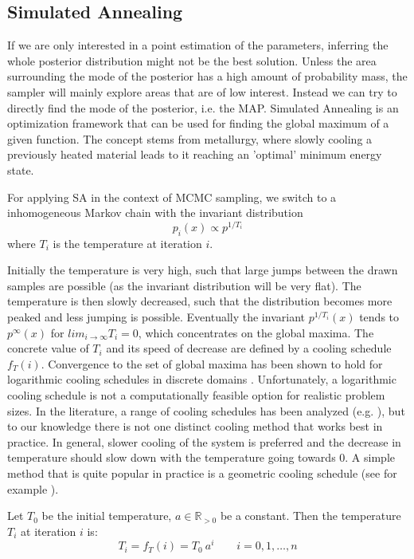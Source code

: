 \FloatBarrier


\subsection{Simulated Annealing}
\label{ss:SA}
If we are only interested in a point estimation of the parameters, 
inferring the whole posterior distribution might not be the best solution.
Unless the area surrounding the mode of the posterior has a high amount of probability mass, the sampler will mainly explore areas that are of low interest.
Instead we can try to directly find the mode of the posterior, i.e. the \gls{MAP}.
Simulated Annealing \citep{kirkpatrick1983optimization} is an optimization framework that can be used for finding the global maximum of a given function.
The concept stems from metallurgy, where slowly cooling a previously heated material leads to it reaching an 'optimal' minimum energy state.


For applying \gls{SA} in the context of \gls{MCMC} sampling, we switch to a inhomogeneous Markov chain with the invariant distribution
$$ p_i (x) \propto p^{1/T_i} $$
where $T_i$ is the temperature at iteration $i$. 

Initially the temperature is very high, such that large jumps between the drawn samples are possible (as the invariant distribution will be very flat). 
The temperature is then slowly decreased, such that the distribution becomes more peaked and less jumping is possible. 
Eventually the invariant $p^{1/T_i}(x)$ tends to $p^\infty(x)$ for $lim_{i\rightarrow \infty}T_i=0$, which concentrates on the global maxima.
The concrete value of $T_i$ and its speed of decrease are defined by a cooling schedule $f_T(i)$. 
Convergence to the set of global maxima has been shown to hold for logarithmic cooling schedules in discrete domains \citep{geman1984stochastic}.
Unfortunately, a logarithmic cooling schedule is not a computationally feasible option for realistic problem sizes.
In the literature, a range of cooling schedules has been analyzed (e.g. \citet{abramson1999simulated}), but to our knowledge there is not one distinct cooling method that works best in practice.
In general, slower cooling of the system is preferred and the decrease in temperature should slow down with the temperature going towards 0.
A simple method that is quite popular in practice is a geometric cooling schedule
(see for example \cite{andrieu2000simulated, yuan2004annealed}).

\begin{tcolorbox}[title=Geometric Cooling Schedule (1)]
	Let $T_0$ be the initial temperature, $a\in\mathbb{R}_{> 0}$ be a constant.
	Then the temperature $T_i$ at iteration $i$ is:
	$$
	T_i = f_T(i) = T_0\  a^{i} \quad \quad i = 0,1,\dots,n
	$$
\end{tcolorbox}

